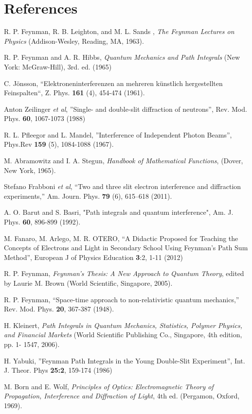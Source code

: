 \documentclass[12pt]{article}   %
\begin{document}
\section*{References}
\begin{thebibliography}{10}

 R. P. Feynman, R. B. Leighton, and M. L. Sands ,
\textsl{The Feynman Lectures on Physics} (Addison-Wesley, Reading, MA, 1963).

 R. P. Feynman and A. R. Hibbs,
\textsl{Quantum Mechanics and Path Integrals} (New York: McGraw-Hill), 3rd. ed. (1965)

 C. J\"onsson, ``Elektroneninterferenzen an mehreren k\"unstlich hergestellten
Feinspalten``, Z. Phys. \textbf{161} (4), 454-474 (1961).

 Anton Zeilinger \textsl{et al}, ''Single- and double-slit diffraction of neutrons'', 
Rev. Mod. Phys. \textbf{60}, 1067-1073 (1988) 

 R. L. Pfleegor and L. Mandel, ''Interference of Independent Photon Beams'', 
Phys.Rev \textbf{159} (5), 1084-1088 (1967).

 M. Abramowitz and I. A. Stegun, \textsl{Handbook of Mathematical Functions},
(Dover, New York, 1965).

 Stefano Frabboni \textsl{et al},
``Two and three slit electron interference and diffraction
experiments,'' Am. Journ. Phys. {\bf 79} (6), 615--618 (2011).

 A. O. Barut and S. Basri, "Path integrals and quantum interference",
Am. J. Phys. \textbf{60}, 896-899 (1992).

 M. Fanaro, M. Arlego, M. R. OTERO, ``A Didactic Proposed for Teaching the Concepts of
Electrons and Light in Secondary School Using Feynman's Path Sum Method'', European J of Physics Education
\textbf{3}:2, 1-11 (2012)

 R. P. Feynman, \textsl{Feynman's Thesis: A New Approach to Quantum Theory},
edited by Laurie M. Brown (World Scientific, Singapore, 2005).

 R. P. Feynman, ``Space-time approach to non-relativistic quantum mechanics,''
Rev. Mod. Phys. \textbf{20}, 367-387 (1948).

 H. Kleinert, 
\textit{Path Integrals in Quantum Mechanics, Statistics, Polymer Physics, and Financial Markets} 
(World Scientific Publishing Co., Singapore, 4th edition, pp. 1- 1547, 2006).

 H. Yabuki, ''Feynman Path Integrals in the Young Double-Slit Experiment'', 
Int. J. Theor. Phys \textbf{25:2}, 159-174 (1986) 

 M. Born and E. Wolf, \textsl{Principles of Optics:
Electromagnetic Theory of Propagation, Interference and Diffraction of Light},
4th ed. (Pergamon, Oxford, 1969).


\end{thebibliography}
\end{document}
